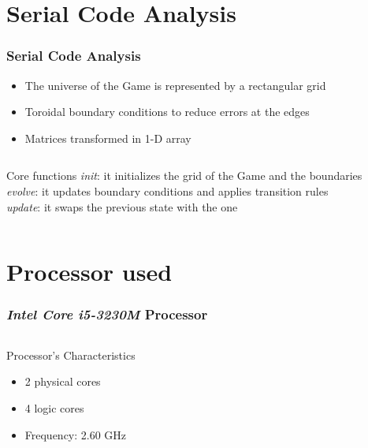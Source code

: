 \documentclass{beamer}
\begin{document}
\section{Serial Code Analysis}
\begin{frame}
	\frametitle{Serial Code Analysis}
	\begin{itemize}
		\item The universe of the Game is represented by a rectangular grid
		\item Toroidal boundary conditions to reduce errors at the edges
		\item Matrices transformed in 1-D array
	\end{itemize}

	\begin{columns}
		\begin{block}{Core functions}
			\textit{init}: it initializes the grid of the Game and the boundaries\\[0.15 cm]
			\textit{evolve}: it updates boundary conditions and applies transition rules\\[0.15 cm]
			\textit{update}: it swaps the previous state with the one
		\end{block}
	\end{columns}
\end{frame}

\section{Processor used}
\begin{frame}
	\frametitle{\emph{Intel Core i5-3230M} Processor}
	\begin{columns}
		\column{0.7\textwidth}
		\begin{block}{Processor's Characteristics}
			\begin{itemize}
				\item 2 physical cores
				\item 4 logic cores
				\item Frequency: 2.60 GHz
			\end{itemize}
		\end{block}
	\end{columns}
\end{frame}
\end{document}
